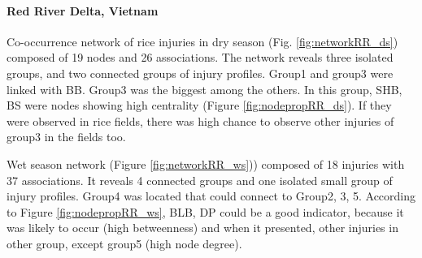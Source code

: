 \paragraph{Red River Delta, Vietnam}
 
Co-occurrence network of rice injuries in dry season (Fig. \ref{fig:networkRR_ds}) composed of 19 nodes and 26 associations. The network reveals three isolated groups, and two connected groups of injury profiles. Group1 and group3 were linked with BB. Group3 was the biggest among the others. In this group, SHB, BS were nodes showing high centrality (Figure \ref{fig:nodepropRR_ds}). If they were observed in rice fields, there was high chance to observe other injuries of group3 in the fields too.

Wet season network (Figure \ref{fig:networkRR_ws})) composed of 18 injuries with 37 associations. It reveals 4 connected groups and one isolated small group of injury profiles. Group4 was located that could connect to Group2, 3, 5. According to Figure \ref{fig:nodepropRR_ws}, BLB, DP could be a good indicator, because it was likely to occur (high betweenness) and when it presented, other injuries in other group, except group5 (high node degree). 


